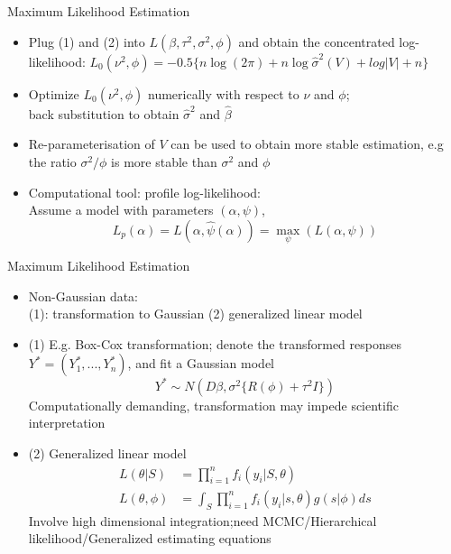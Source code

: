 \documentclass{beamer}
\begin{document}
\begin{frame}{Maximum Likelihood Estimation}
	\begin{itemize}
		\item Plug (1) and (2) into $L(\beta, \tau^2, \sigma^2, \phi)$ and obtain  the {\color{blue}concentrated log-likelihood}: 
		$L_0(\nu^2, \phi) = -0.5 \{n \log (2 \pi) + n \log \hat{\sigma}^2(V) +  log |V|+ n \}$
		\item Optimize $L_0(\nu^2, \phi)$ numerically with respect to $\nu$ and $\phi$; \\ back substitution to obtain $\hat{\sigma}^2$ and $\hat{\beta}$
		\item Re-parameterisation of $V$ can be used to obtain more stable estimation, e.g  the ratio $\sigma^2 / \phi$ is more stable than $\sigma^2$ and $\phi$
		\item  Computational tool:  {\color{blue}profile log-likelihood}: \\
		Assume a model with parameters $(\alpha, \psi)$, 
		$$L_p(\alpha) = L(\alpha, \hat{\psi}(\alpha))  = \max_{\psi}(L(\alpha, \psi))$$  %
	\end{itemize}
\end{frame}

\begin{frame}{Maximum Likelihood Estimation}
	\begin{itemize}
		\item Non-Gaussian data: \\ 
		(1): transformation to Gaussian (2)  generalized linear model 
		\item   (1) E.g. Box-Cox transformation; denote the transformed responses $Y^{\ast} = (Y_1^{\ast}, ..., Y_n^{\ast})$, and fit a Gaussian model 
		$$Y^{\ast} \sim N(D\beta, \sigma^2 \{R(\phi) + \tau^2I\}) $$
		Computationally demanding, transformation may impede scientific interpretation
		\item (2) Generalized linear model 
		\begin{align*}  %
		L(\theta|S) &= \prod_{i=1}^n f_i(y_i|S, \theta)\\
		L(\theta, \phi) &= \int_ S \prod_{i=1}^n f_i(y_i|s, \theta)g(s|\phi) ds
		\end{align*}
		Involve high dimensional integration;need MCMC/Hierarchical likelihood/Generalized estimating equations
	\end{itemize}
\end{frame}
\end{document}
